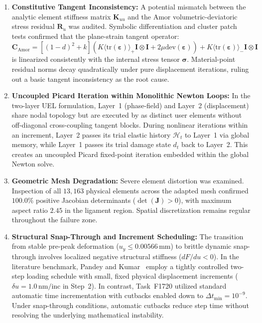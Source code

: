 \begin{enumerate}
  \item \textbf{Constitutive Tangent Inconsistency:} 
  A potential mismatch between the analytic element stiffness matrix $\mathbf{K}_{uu}$ and the Amor volumetric-deviatoric stress residual $\mathbf{R}_u$ was audited. Symbolic differentiation and cluster patch tests confirmed that the plane-strain tangent operator:
  \begin{equation}
    \mathbf{C}_{\mathrm{Amor}} = \left[ (1-d)^2 + k \right] \left( K \langle \mathrm{tr}(\boldsymbol{\varepsilon}) \rangle_+ \mathbf{I}\otimes\mathbf{I} + 2\mu \mathrm{dev}(\boldsymbol{\varepsilon}) \right) + K \langle \mathrm{tr}(\boldsymbol{\varepsilon}) \rangle_- \mathbf{I}\otimes\mathbf{I}
    \label{eq:amor_tangent}
  \end{equation}
  is linearized consistently with the internal stress tensor $\boldsymbol{\sigma}$. Material-point residual norms decay quadratically under pure displacement iterations, ruling out a basic tangent inconsistency as the root cause.

  \item \textbf{Uncoupled Picard Iteration within Monolithic Newton Loops:}
  In the two-layer UEL formulation, Layer~1 (phase-field) and Layer~2 (displacement) share nodal topology but are executed by \Abaqus as distinct user elements without off-diagonal cross-coupling tangent blocks. During nonlinear iterations within an increment, Layer~2 passes its trial elastic history $\mathcal{H}_t$ to Layer~1 via global memory, while Layer~1 passes its trial damage state $d_t$ back to Layer~2. This creates an uncoupled Picard fixed-point iteration embedded within the global Newton solve.

  \item \textbf{Geometric Mesh Degradation:}
  Severe element distortion was examined. Inspection of all $13{,}163$ physical elements across the adapted mesh confirmed $100.0\%$ positive Jacobian determinants ($\det(\mathbf{J}) > 0$), with maximum aspect ratio $2.45$ in the ligament region. Spatial discretization remains regular throughout the failure zone.

  \item \textbf{Structural Snap-Through and Increment Scheduling:}
  The transition from stable pre-peak deformation ($u_y \le 0.00566\,\mathrm{mm}$) to brittle dynamic snap-through involves localized negative structural stiffness ($dF/du < 0$). In the literature benchmark, Pandey and Kumar~\cite{pandey2025} employ a tightly controlled two-step loading schedule with small, fixed physical displacement increments ($\delta u = 1.0\,\mathrm{nm/inc}$ in Step~2). In contrast, Task~F1720 utilized standard \Abaqus automatic time incrementation with cutbacks enabled down to $\Delta t_{\min} = 10^{-9}$. Under snap-through conditions, automatic cutbacks reduce step time without resolving the underlying mathematical instability.
\end{enumerate}

